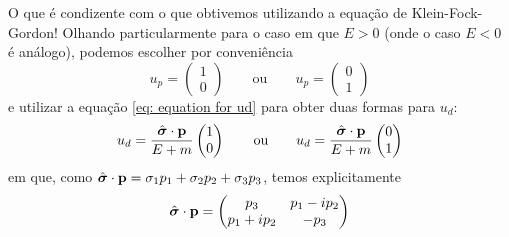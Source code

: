     O que é condizente com o que obtivemos utilizando a equação de Klein-Fock-Gordon! Olhando particularmente para o caso em que $E>0$ (onde o caso $E<0$ é análogo), podemos escolher por conveniência
        \begin{equation*}
            u_{p} = \begin{pmatrix}
                1 \\ 0
            \end{pmatrix} \qquad \text{ou} \qquad 
            u_{p} = \begin{pmatrix}
                0 \\ 1
            \end{pmatrix}
        \end{equation*}
    e utilizar a equação \eqref{eq: equation for ud} para obter duas formas para $u_{d}$:
        \begin{equation*}
            u_{d} = \dfrac{\hat{\boldsymbol{\sigma}}\cdot\vb{p}}{E+m}\begin{pmatrix}
                1 \\ 0
            \end{pmatrix} \qquad \text{ou} \qquad 
            u_{d} = \dfrac{\hat{\boldsymbol{\sigma}}\cdot\vb{p}}{E+m}\begin{pmatrix}
                0 \\ 1
            \end{pmatrix}
        \end{equation*}
    em que, como $\hat{\boldsymbol{\sigma}}\cdot\vb{p} = \sigma_{1}{p_{1}} + \sigma_{2}{p_{2}} + \sigma_{3}{p}_{3}$, temos explicitamente
        \begin{equation*}
            \hat{\boldsymbol{\sigma}}\cdot\vb{p} = \begin{pmatrix}
                {p}_{3} & {p}_{1} - ip_{2} \\
                {p}_{1} + i{p}_{2} & -{p}_{3}
            \end{pmatrix}
        \end{equation*}


